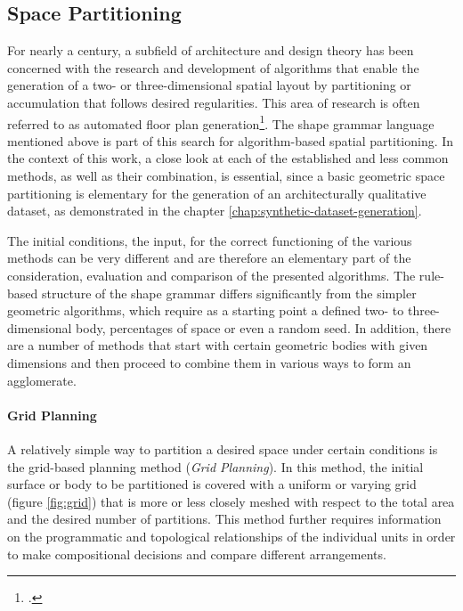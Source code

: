 \documentclass[a4paper, 12pt]{report}
\begin{document}
\subsection{Space Partitioning}\label{subsec:space-partitioning}

For nearly a century, a subfield of architecture and design theory has been concerned with the research and development of algorithms that enable the generation of a two- or three-dimensional spatial layout by partitioning or accumulation that follows desired regularities. This area of research is often referred to as automated floor plan generation\footcite{nisztuk2019hybrid}. The shape grammar language mentioned above is part of this search for algorithm-based spatial partitioning. In the context of this work, a close look at each of the established and less common methods, as well as their combination, is essential, since a basic geometric space partitioning is elementary for the generation of an architecturally qualitative dataset, as demonstrated in the chapter \ref{chap:synthetic-dataset-generation}.

The initial conditions, the input, for the correct functioning of the various methods can be very different and are therefore an elementary part of the consideration, evaluation and comparison of the presented algorithms. The rule-based structure of the shape grammar differs significantly from the simpler geometric algorithms, which require as a starting point a defined two- to three-dimensional body, percentages of space or even a random seed. In addition, there are a number of methods that start with certain geometric bodies with given dimensions and then proceed to combine them in various ways to form an agglomerate.

\paragraph{Grid Planning}\label{par:grid-planning}

A relatively simple way to partition a desired space under certain conditions is the grid-based planning method (\textit{Grid Planning}). In this method, the initial surface or body to be partitioned is covered with a uniform or varying grid (figure \ref{fig:grid}) that is more or less  closely meshed with respect to the total area and the desired number of partitions. This method further requires information on the programmatic and topological relationships of the individual units in order to make compositional decisions and compare different arrangements.
\end{document}
